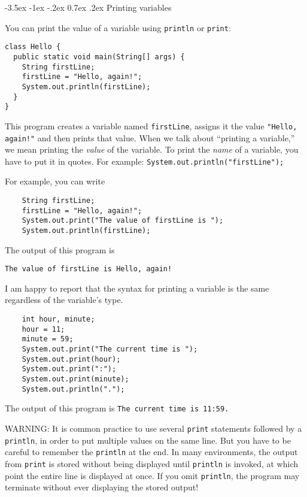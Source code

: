 \documentclass{book}
\makeatletter
\renewcommand{\section}{\@startsection 
    {section} {1} {0mm}%
    {-3.5ex \@plus -1ex \@minus -.2ex}%
    {0.7ex \@plus.2ex}%
    {\normalfont\Large\bfseries}}
\makeatother
\begin{document}
\section{Printing variables}
\label{printing}

You can print the value of a variable using {\tt println} or
{\tt print}:

\begin{verbatim}
class Hello {
  public static void main(String[] args) {
    String firstLine;
    firstLine = "Hello, again!";
    System.out.println(firstLine);
  }
}
\end{verbatim}
%
This program creates a variable named {\tt firstLine}, assigns
it the value {\tt "Hello, again!"} and then prints that value.
When we talk about ``printing a variable,'' we mean printing
the {\em value} of the variable.  To print the {\em name} of
a variable, you have to put it in quotes.
For example: {\tt System.out.println("firstLine");}

For example, you can write

\begin{verbatim}
    String firstLine;
    firstLine = "Hello, again!";
    System.out.print("The value of firstLine is ");
    System.out.println(firstLine);
\end{verbatim}
%
The output of this program is

\begin{verbatim}
The value of firstLine is Hello, again!
\end{verbatim}
%
I am happy to report that the syntax for printing a variable
is the same regardless of the variable's type.

\begin{verbatim}
    int hour, minute;
    hour = 11;
    minute = 59;
    System.out.print("The current time is ");
    System.out.print(hour);
    System.out.print(":");
    System.out.print(minute);
    System.out.println(".");
\end{verbatim}
%
The output of this program is {\tt The current time is 11:59.}

WARNING: It is common practice to use several {\tt print} statements
followed by a {\tt println}, in order to put multiple values
on the same line.  But you have to be careful to remember
the {\tt println} at the end.  In many environments, the
output from {\tt print} is stored without being displayed until
{\tt println} is invoked, at which point the entire
line is displayed at once.  If you omit {\tt println}, the
program may terminate without ever displaying the stored output!
\end{document}
